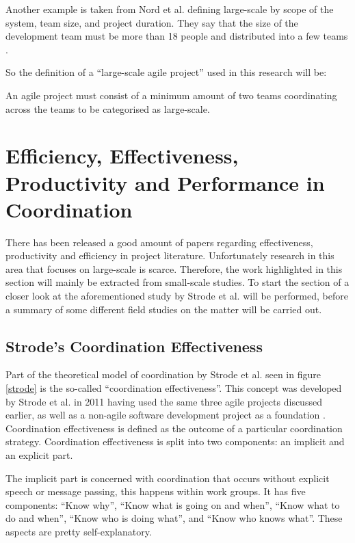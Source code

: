 Another example is taken from Nord et al. defining large-scale by scope of the system, team size, and project duration. They say that the size of the development team must be more than 18 people and distributed into a few teams \cite{Robert2014}.

So the definition of a ``large-scale agile project'' used in this research will be:

\begin{fancyquotes}
An agile project must consist of a minimum amount of two teams coordinating across the teams to be categorised as large-scale.
\end{fancyquotes}

\section{Efficiency, Effectiveness, Productivity and Performance in Coordination}
\label{efficiency}

There has been released a good amount of papers regarding effectiveness, productivity and efficiency in project literature. Unfortunately research in this area that focuses on large-scale is scarce. Therefore, the work highlighted in this section will mainly be extracted from small-scale studies. To start the section of a closer look at the aforementioned study by Strode et al. will be performed, before a summary of some different field studies on the matter will be carried out.

\subsection{Strode's Coordination Effectiveness}
\label{cordinationeffectiveness}

Part of the theoretical model of coordination by Strode et al. seen in figure \ref{strode} is the so-called ``coordination effectiveness''. This concept was developed by Strode et al. in 2011 having used the same three agile projects discussed earlier, as well as a non-agile software development project as a foundation \cite{Strode2011}. Coordination effectiveness is defined as the outcome of a particular coordination strategy. Coordination effectiveness is split into two components: an implicit and an explicit part.

The implicit part is concerned with coordination that occurs without explicit speech or message passing, this happens within work groups. It has five components: ``Know why'', ``Know what is going on and when'', ``Know what to do and when'', ``Know who is doing what'', and ``Know who knows what''. These aspects are pretty self-explanatory.

